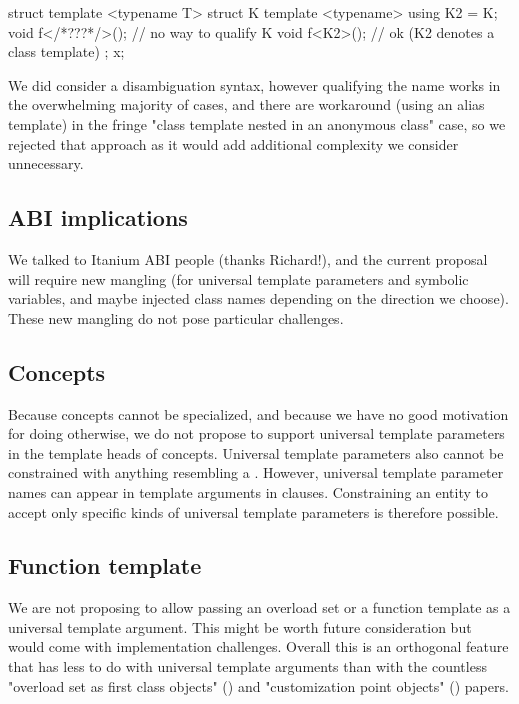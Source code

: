 \documentclass{wg21}
\begin{document}
\begin{colorblock}
struct {
    template <typename T>
    struct K {
        template <typename>
        using K2 = K;
        void f</*???*/>(); // no way to qualify K
        void f<K2>(); // ok (K2 denotes a class template)
    };
} x;
\end{colorblock}

We did consider a disambiguation syntax, however qualifying the name works in the overwhelming majority of cases,
and there are workaround (using an alias template) in the fringe "class template nested in an anonymous class" case,
so we rejected that approach as it would add additional complexity we consider unnecessary.

\subsection{ABI implications}

We talked to Itanium ABI people (thanks Richard!), and the current proposal will require new mangling (for universal template parameters and symbolic variables, and maybe injected class names depending on the direction we choose). These new mangling do not pose particular challenges.

\subsection{Concepts}

Because concepts cannot be specialized, and because we have no good motivation for doing otherwise, we do not propose to support universal template parameters in the template heads of concepts.
Universal template parameters also cannot be constrained with anything resembling a .
However, universal template parameter names can appear in template arguments in  clauses.
Constraining an entity to accept only specific kinds of universal template parameters is therefore possible.


\subsection{Function template}


We are not proposing to allow passing an overload set or a function template as a universal template argument.
This might be worth future consideration but would come with implementation challenges.
Overall this is an orthogonal feature that has less to do with universal template arguments than with the countless
"overload set as first class objects" () and "customization point objects" () papers.
\end{document}
